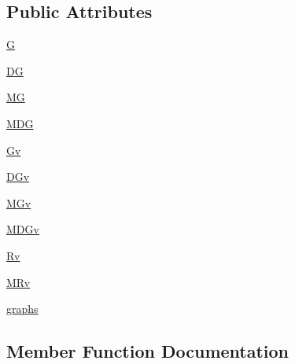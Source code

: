 \subsection*{Public Attributes}
\begin{DoxyCompactItemize}
\item 
\hyperlink{classnetworkx_1_1classes_1_1tests_1_1test__graphviews_1_1TestChainsOfViews_a43523e8c8c86682689f9829734647f08}{G}
\item 
\hyperlink{classnetworkx_1_1classes_1_1tests_1_1test__graphviews_1_1TestChainsOfViews_a6771ca2e8b0b6ceb790e627cfa55ef94}{DG}
\item 
\hyperlink{classnetworkx_1_1classes_1_1tests_1_1test__graphviews_1_1TestChainsOfViews_a06ec5ded2dc6affa1791915d391040a4}{MG}
\item 
\hyperlink{classnetworkx_1_1classes_1_1tests_1_1test__graphviews_1_1TestChainsOfViews_a48c88fb91532530d7f77c4ca57b18a29}{M\+DG}
\item 
\hyperlink{classnetworkx_1_1classes_1_1tests_1_1test__graphviews_1_1TestChainsOfViews_ad485167d78a511a00b234686c9225382}{Gv}
\item 
\hyperlink{classnetworkx_1_1classes_1_1tests_1_1test__graphviews_1_1TestChainsOfViews_ae6cd65770e368834d1268ad0cab30828}{D\+Gv}
\item 
\hyperlink{classnetworkx_1_1classes_1_1tests_1_1test__graphviews_1_1TestChainsOfViews_aab9cd2563a2630f88dbff863424461d8}{M\+Gv}
\item 
\hyperlink{classnetworkx_1_1classes_1_1tests_1_1test__graphviews_1_1TestChainsOfViews_aa3480a85802c1661d48d24a77af28b64}{M\+D\+Gv}
\item 
\hyperlink{classnetworkx_1_1classes_1_1tests_1_1test__graphviews_1_1TestChainsOfViews_a4103446854bb24f7d119cbdcf7ec3c71}{Rv}
\item 
\hyperlink{classnetworkx_1_1classes_1_1tests_1_1test__graphviews_1_1TestChainsOfViews_a301107dc9bd216e0d8935991769773fe}{M\+Rv}
\item 
\hyperlink{classnetworkx_1_1classes_1_1tests_1_1test__graphviews_1_1TestChainsOfViews_a2870fa718284297c91bbdda86cfa7174}{graphs}
\end{DoxyCompactItemize}


\subsection{Member Function Documentation}
\mbox{\label{classnetworkx_1_1classes_1_1tests_1_1test__graphviews_1_1TestChainsOfViews_a0e920a1e2dc4824b6bc6b0ad23919040}} 
